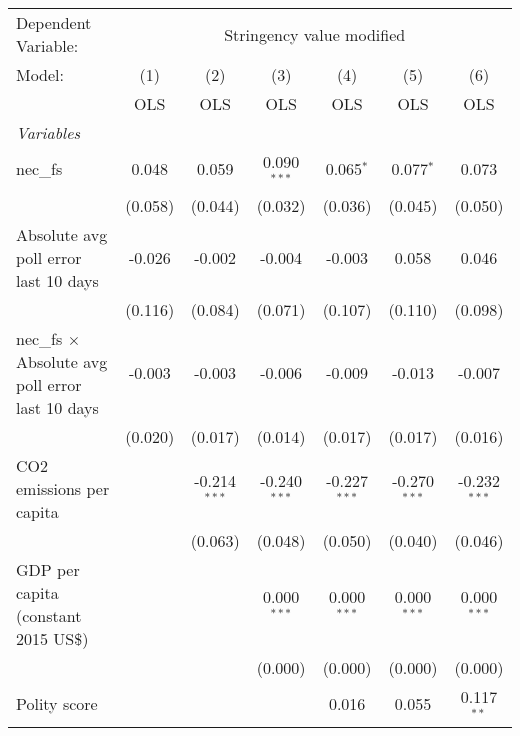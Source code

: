 
\begingroup
\centering
\begin{tabular}{lcccccc}
   \toprule
   Dependent Variable: & \multicolumn{6}{c}{Stringency value modified}\\
   Model:                                                  & (1)     & (2)            & (3)            & (4)            & (5)            & (6)\\  
                                                           &  OLS    & OLS            & OLS            & OLS            & OLS            & OLS\\  
   \midrule
   \emph{Variables}\\
   nec\_fs                                                 & 0.048   & 0.059          & 0.090$^{***}$  & 0.065$^{*}$    & 0.077$^{*}$    & 0.073\\   
                                                           & (0.058) & (0.044)        & (0.032)        & (0.036)        & (0.045)        & (0.050)\\   
   Absolute avg poll error last 10 days                    & -0.026  & -0.002         & -0.004         & -0.003         & 0.058          & 0.046\\   
                                                           & (0.116) & (0.084)        & (0.071)        & (0.107)        & (0.110)        & (0.098)\\   
   nec\_fs $\times$ Absolute avg poll error last 10 days   & -0.003  & -0.003         & -0.006         & -0.009         & -0.013         & -0.007\\   
                                                           & (0.020) & (0.017)        & (0.014)        & (0.017)        & (0.017)        & (0.016)\\   
   CO2 emissions per capita                                &         & -0.214$^{***}$ & -0.240$^{***}$ & -0.227$^{***}$ & -0.270$^{***}$ & -0.232$^{***}$\\   
                                                           &         & (0.063)        & (0.048)        & (0.050)        & (0.040)        & (0.046)\\   
   GDP per capita (constant 2015 US\$)                     &         &                & 0.000$^{***}$  & 0.000$^{***}$  & 0.000$^{***}$  & 0.000$^{***}$\\   
                                                           &         &                & (0.000)        & (0.000)        & (0.000)        & (0.000)\\   
   Polity score                                            &         &                &                & 0.016          & 0.055          & 0.117$^{**}$\\   

\end{tabular}
